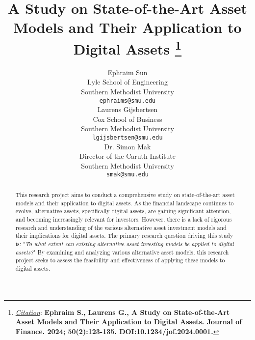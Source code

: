 \documentclass[12pt]{article}
\title{A Study on State-of-the-Art Asset Models and Their Application to Digital Assets
\thanks{\textit{\underline{Citation}}: 
\textbf{Ephraim S., Laurens G., A Study on State-of-the-Art Asset Models and Their Application to Digital Assets. Journal of Finance. 2024; 50(2):123-135. DOI:10.1234/jof.2024.0001.}} 
}
\author{
  Ephraim Sun \\
  Lyle School of Engineering \\
  Southern Methodist University \\
  \texttt{ephraims@smu.edu} \\
   \And
  Laurens Gijsbertsen \\
  Cox School of Business \\
  Southern Methodist University \\
  \texttt{lgijsbertsen@smu.edu} \\
    \And
  Dr. Simon Mak \\
  Director of the Caruth Institute \\
  Southern Methodist University \\
  \texttt{smak@smu.edu} \\
}
\begin{document}
\maketitle


\begin{abstract}
This research project aims to conduct a comprehensive study on state-of-the-art asset models and their application to digital assets. As the financial landscape continues to evolve, alternative assets, specifically digital assets, are gaining significant attention, and becoming increasingly relevant for investors. However, there is a lack of rigorous research and understanding of the various alternative asset investment models and their implications for digital assets. The primary research question driving this study is: "\textit{To what extent can existing alternative asset investing models be applied to digital assets?}" By examining and analyzing various alternative asset models, this research project seeks to assess the feasibility and effectiveness of applying these models to digital assets.
\end{abstract}


















\newpage	
  



\end{document}
